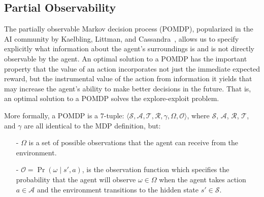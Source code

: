 \documentclass[11pt]{article}
\begin{document}
\subsection{Partial Observability}

The partially observable Markov decision process (POMDP), popularized in the AI community by Kaelbling, Littman, and Cassandra~, allows us to specify explicitly what information about the agent's surroundings 
is and is not directly observable by the agent. An optimal solution to a POMDP has the important property that the value of an action incorporates not just the immediate expected reward, but the instrumental value of the action from information it yields that may increase the agent's ability to make better decisions in the future. That is, an optimal solution to a POMDP solves the explore-exploit problem.  

More formally, a POMDP is a $7$-tuple: $\langle \mathcal{S},\mathcal{A},\mathcal{T},\mathcal{R}, \gamma, \Omega,\mathcal{O} \rangle$, where $\mathcal{S}$, $\mathcal{A}$, $\mathcal{R}$, $\mathcal{T}$, and $\gamma$ are all identical to the MDP definition, but:
\begin{itemize}
\item[-] $\Omega$ is a set of possible observations that the agent can receive from the environment.
\item[-] $\mathcal{O} = \Pr(\omega \mid s', a)$, is the observation function which specifies the probability that the agent will observe $\omega \in \Omega$ when the agent takes action $a \in \mathcal{A}$ and the environment transitions to the hidden state $s' \in \mathcal{S}$.
\end{itemize}
\end{document}
